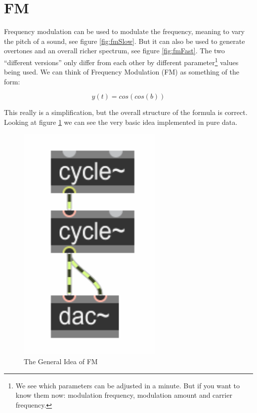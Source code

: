 
\section{FM} %
\label{sub:FM}

Frequency modulation can be used to modulate the frequency, meaning to vary the pitch of a sound, see figure \ref{fig:fmSlow}. But it can also be used to generate overtones and an overall richer spectrum, see figure \ref{fig:fmFast}. The two ``different versions'' only differ from each other by different parameter\footnote{We see which parameters can be adjusted in a minute. But if you want to know them now: modulation frequency, modulation amount and carrier frequency.} values being used.
We can think of Frequency Modulation (FM) as something of the form:

\begin{equation}
	y(t) = cos(cos(b))
\end{equation}

This really is a simplification, but the overall structure of the formula is correct.
Looking at figure \ref{fig:fmIdea} we can see the very basic idea implemented in pure data.
\begin{figure}[H]
	\begin{center}
		\includegraphics[width = 7cm]{img/FMgeneral.png}
		\caption{The General Idea of FM}
		\label{fig:fmIdea}
	\end{center}
\end{figure}

